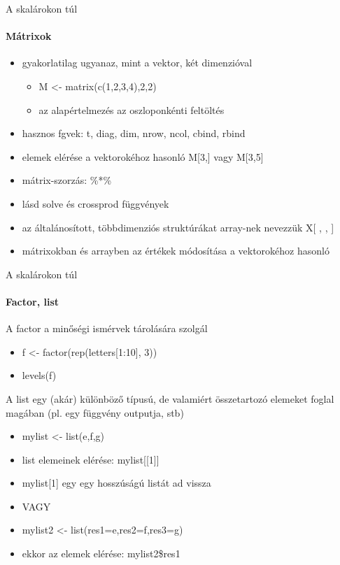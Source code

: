 \documentclass[10pt]{beamer}
\begin{document}
\begin{frame}{A skalárokon túl}
\framesubtitle{Mátrixok}
\begin{itemize}
\item gyakorlatilag ugyanaz, mint a vektor, két dimenzióval
\begin{itemize}
\item M <- matrix(c(1,2,3,4),2,2)
\item az alapértelmezés az oszloponkénti feltöltés
\end{itemize}
\item hasznos fgvek: t, diag, dim, nrow, ncol, cbind, rbind
\item elemek elérése a vektorokéhoz hasonló M[3,] vagy M[3,5]
\item mátrix-szorzás: \%*\%
\item lásd solve és crossprod függvények
\item az általánosított, többdimenziós struktúrákat array-nek nevezzük X[ , , ]
\item mátrixokban és arrayben az értékek módosítása a vektorokéhoz hasonló
\end{itemize}
\end{frame}

\begin{frame}{A skalárokon túl}
\framesubtitle{Factor, list}
A factor a minőségi ismérvek tárolására szolgál
\begin{itemize}
\item f <- factor(rep(letters[1:10], 3))
\item levels(f)
\end{itemize}
A list egy (akár) különböző típusú, de valamiért összetartozó elemeket foglal magában (pl. egy függvény outputja, stb)
\begin{itemize}
\item mylist <- list(e,f,g)
\item list elemeinek elérése: mylist[[1]]
\item mylist[1] egy egy hosszúságú listát ad vissza
\item VAGY
\item mylist2 <- list(res1=e,res2=f,res3=g)
\item ekkor az elemek elérése: mylist2\$res1
\end{itemize}
\end{frame}
\end{document}
